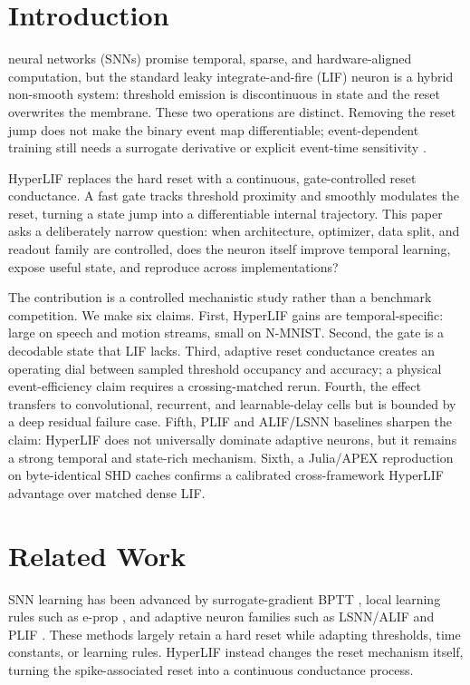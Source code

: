 \documentclass[journal]{IEEEtran}
\newcommand{\hlif}{HyperLIF}
\newcommand{\lif}{LIF}
\newcommand{\plif}{PLIF}
\newcommand{\alif}{ALIF}
\newcommand{\apex}{APEX}
\begin{document}
\section{Introduction}
 neural networks (SNNs) promise temporal, sparse, and hardware-aligned computation, but the standard leaky integrate-and-fire (\lif) neuron is a hybrid non-smooth system: threshold emission is discontinuous in state and the reset overwrites the membrane. These two operations are distinct. Removing the reset jump does not make the binary event map differentiable; event-dependent training still needs a surrogate derivative or explicit event-time sensitivity \cite{Neftci2019Surrogate,Zenke2018SuperSpike}.

\hlif{} replaces the hard reset with a continuous, gate-controlled reset conductance. A fast gate tracks threshold proximity and smoothly modulates the reset, turning a state jump into a differentiable internal trajectory. This paper asks a deliberately narrow question: when architecture, optimizer, data split, and readout family are controlled, does the neuron itself improve temporal learning, expose useful state, and reproduce across implementations?

The contribution is a controlled mechanistic study rather than a benchmark competition. We make six claims. First, \hlif{} gains are temporal-specific: large on speech and motion streams, small on N-MNIST. Second, the gate is a decodable state that \lif{} lacks. Third, adaptive reset conductance creates an operating dial between sampled threshold occupancy and accuracy; a physical event-efficiency claim requires a crossing-matched rerun. Fourth, the effect transfers to convolutional, recurrent, and learnable-delay cells but is bounded by a deep residual failure case. Fifth, \plif{} \cite{Fang2021PLIF} and \alif{}/LSNN \cite{Bellec2018LSNN} baselines sharpen the claim: \hlif{} does not universally dominate adaptive neurons, but it remains a strong temporal and state-rich mechanism. Sixth, a Julia/\apex{} reproduction on byte-identical SHD caches confirms a calibrated cross-framework \hlif{} advantage over matched dense \lif{}.

\section{Related Work}
SNN learning has been advanced by surrogate-gradient BPTT \cite{Neftci2019Surrogate,Zenke2018SuperSpike}, local learning rules such as e-prop \cite{Bellec2020Eprop}, and adaptive neuron families such as LSNN/\alif{} \cite{Bellec2018LSNN} and \plif{} \cite{Fang2021PLIF}. These methods largely retain a hard reset while adapting thresholds, time constants, or learning rules. \hlif{} instead changes the reset mechanism itself, turning the spike-associated reset into a continuous conductance process.
\end{document}

